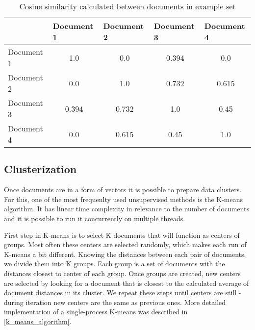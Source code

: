 \begin{table}[H]
	\centering
	\caption{Cosine similarity calculated between documents in example set}
	\label{casine_similarity}
	\begin{tabular}{@{}lcccc@{}}
		\toprule
		& \multicolumn{1}{l}{Document 1} & \multicolumn{1}{l}{Document 2} & \multicolumn{1}{l}{Document 3} & \multicolumn{1}{l}{Document 4} \\ \midrule
		Document 1 & 1.0                            & 0.0                            & 0.394                          & 0.0                            \\
		Document 2 & 0.0                            & 1.0                            & 0.732                          & 0.615                          \\
		Document 3 & 0.394                          & 0.732                          & 1.0                            & 0.45                           \\
		Document 4 & 0.0                            & 0.615                          & 0.45                           & 1.0                            \\ \bottomrule
	\end{tabular}
\end{table}

\subsection{Clusterization}
Once documents are in a form of vectors it is possible to prepare data clusters. For this, one of the most frequenlty used unsupervised methods is the K-means algorithm. It has linear time complexity in relevance to the number of documents and it is possible to run it concurrently on multiple threads. 

First step in K-means is to select K documents that will function as centers of groups. Most often these centers are selected randomly, which makes each run of K-means a bit different.
Knowing the distances between each pair of documents, we divide them into K groups. Each group is a set of documents with the distances closest to center of each group. Once groups are created, new centers are selected by looking for a document that is closest to the calculated average of document distances in its cluster. We repeat these steps until centers are still - during iteration new centers are the same as previous ones. 
More detailed implementation of a single-process K-means was described in \ref{k_means_algorithm}.

